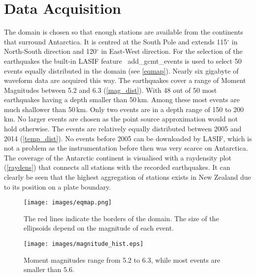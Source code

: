 
\chapter{Data Acquisition}

The domain is chosen so that enough stations are available from the continents that surround Antarctica.
It is centred at the South Pole and extends 115$^\circ$ in North-South direction and 120$^\circ$ in
East-West direction. 
For the selection of the earthquakes the built-in LASIF feature \
add\_gcmt\_events is used to select 50 events equally distributed in the
domain (see \autoref{eqmap}). Nearly six gigabyte of waveform data are acquired this way.
The earthquakes cover a range of Moment Magnitudes between 5.2 and 6.3 (\autoref{mag_dist}). 
With 48 out of 50 most earthquakes having a depth smaller than 50\,km. Among these most 
events are much shallower than 50\,km. Only two events are in a depth range of 150 to 200\,km. 
No larger events are chosen as the point source approximation would not hold otherwise. 
The events are relatively equally distributed between 2005 and 2014 (\autoref{temp_dist}). No events before 2005 can 
be downloaded by LASIF, which is not a problem as the instrumentation before then was very scarce on Antarctica. 
The coverage of the Antarctic continent is visualised with a raydensity plot (\autoref{raydens}) that connects all 
stations with the recorded earthquakes. It can clearly be seen that the highest aggregation of stations exists in 
New Zealand due to its position on a plate boundary. \\


\begin{figure}[H]
\begin{center}
\texttt{[image: images/eqmap.png]}
\caption{The red lines indicate the borders of the domain. The size of the ellipsoids depend on the magnitude of each event.}
\label{eqmap}
\end{center}
\end{figure}

\begin{figure}[H]
\begin{center}
\texttt{[image: images/magnitude\_hist.eps]}
\caption{Moment magnitudes range from 5.2 to 6.3, while most events are smaller than 5.6.}
\label{mag_dist}
\end{center}
\end{figure}

